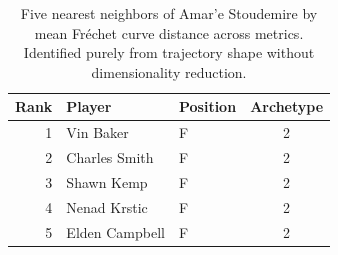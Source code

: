 \begin{table}[htbp]
  \centering\small
  \begin{tabular}{rllc}
    \toprule
    Rank & Player & Position & Archetype \\
    \midrule
    1 & Vin Baker & F & 2 \\
    2 & Charles Smith & F & 2 \\
    3 & Shawn Kemp & F & 2 \\
    4 & Nenad Krstic & F & 2 \\
    5 & Elden Campbell & F & 2 \\
    \bottomrule
  \end{tabular}
  \caption{Five nearest neighbors of Amar'e Stoudemire by mean Fr\'{e}chet curve distance across metrics. Identified purely from trajectory shape without dimensionality reduction.}
  \label{tab:Amar_e_Stoudemire_frechet_curve_neighbors}
\end{table}


